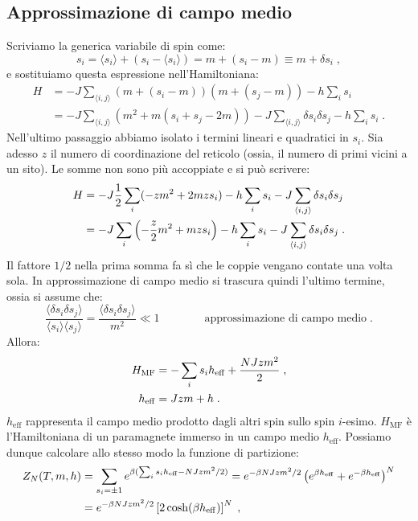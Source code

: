 \documentclass[10pt,a4paper]{report}
\theoremstyle{definition}
\numberwithin{equation}{section}
\newcommand{\bra}{\langle}
\newcommand{\ket}{\rangle}
\begin{document}
\subsection{Approssimazione di campo medio}
Scriviamo la generica variabile di spin come:
\begin{equation}
s_i=\bra s_i\ket+(s_i-\bra s_i\ket)=m+(s_i-m)\equiv m+\delta s_i\;,
\end{equation}
e sostituiamo questa espressione nell'Hamiltoniana:
\begin{align*}
H &= -J\sum_{\bra i,j\ket}(m+(s_i-m))(m+(s_j-m))-h\sum_is_i \\
&= -J\sum_{\bra i,j\ket}(m^2+m(s_i+s_j-2m))-J\sum_{\bra i,j\ket}\delta s_i\delta s_j-h\sum_is_i\;.
\end{align*}
Nell'ultimo passaggio abbiamo isolato i termini lineari e quadratici in $s_i$. Sia adesso $z$ il numero di coordinazione del reticolo (ossia, il numero di primi vicini a un sito). Le somme non sono più accoppiate e si può scrivere:
\begin{align}
H &= -J\frac{1}{2}\sum_i(-zm^2+2mzs_i)-h\sum_is_i-J\sum_{\bra i,j\ket}\delta s_i\delta s_j \notag \\
&=-J\sum_i\left(-\frac{z}{2}m^2+mzs_i\right)-h\sum_is_i-J\sum_{\bra i,j\ket}\delta s_i\delta s_j\;.
\end{align}
Il fattore $1/2$ nella prima somma fa sì che le coppie vengano contate una volta sola. In approssimazione di campo medio si trascura quindi l'ultimo termine, ossia si assume che:
\begin{equation}
\frac{\bra \delta s_i\delta s_j\ket}{\bra s_i\ket\bra s_j\ket}=\frac{\bra \delta s_i\delta s_j\ket}{m^2}\ll 1 \qquad\qquad \mbox{approssimazione di campo medio}\;.
\end{equation}
Allora:
\begin{align}
H_{\mathrm{MF}} &= -\sum_is_ih_{\mathrm{eff}}+\frac{NJzm^2}{2}\;, \\
h_{\mathrm{eff}}&= Jzm+h \notag\;.
\end{align}
$h_{\mathrm{eff}}$ rappresenta il campo medio prodotto dagli altri spin sullo spin $i$-esimo. $H_{\mathrm{MF}}$ è l'Hamiltoniana di un paramagnete immerso in un campo medio $h_{\mathrm{eff}}$. Possiamo dunque calcolare allo stesso modo la funzione di partizione:
\begin{align}
Z_N(T,m,h)&= \sum_{s_i=\pm 1}e^{\beta(\sum_is_ih_{\mathrm{eff}}-NJzm^2/2)}=e^{-\beta NJzm^2/2}\left(e^{\beta h_{\mathrm{eff}}}+e^{-\beta h_{\mathrm{eff}}}\right)^N \notag \\
&= e^{-\beta NJzm^2/2}\left[2\cosh(\beta h_{\mathrm{eff}})\right]^N\;,
\end{align}
\end{document}

